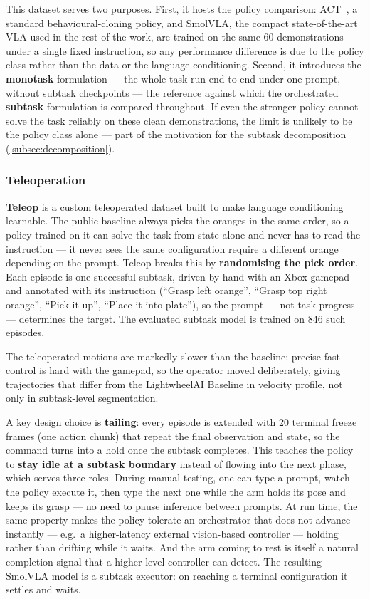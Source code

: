 This dataset serves two purposes. First, it hosts the policy comparison: ACT~\cite{zhao2023act}, a standard behavioural-cloning policy, and SmolVLA, the compact state-of-the-art VLA used in the rest of the work, are trained on the same 60 demonstrations under a single fixed instruction, so any performance difference is due to the policy class rather than the data or the language conditioning. Second, it introduces the \textbf{monotask} formulation --- the whole task run end-to-end under one prompt, without subtask checkpoints --- the reference against which the orchestrated \textbf{subtask} formulation is compared throughout. If even the stronger policy cannot solve the task reliably on these clean demonstrations, the limit is unlikely to be the policy class alone --- part of the motivation for the subtask decomposition (\cref{subsec:decomposition}).

\subsubsection{Teleoperation}
\label{subsec:teleop}

\textbf{Teleop} is a custom teleoperated dataset built to make language conditioning learnable. The public baseline always picks the oranges in the same order, so a policy trained on it can solve the task from state alone and never has to read the instruction --- it never sees the same configuration require a different orange depending on the prompt. Teleop breaks this by \textbf{randomising the pick order}. Each episode is one successful subtask, driven by hand with an Xbox gamepad and annotated with its instruction (``Grasp left orange'', ``Grasp top right orange'', ``Pick it up'', ``Place it into plate''), so the prompt --- not task progress --- determines the target. The evaluated subtask model is trained on 846 such episodes.

The teleoperated motions are markedly slower than the baseline: precise fast control is hard with the gamepad, so the operator moved deliberately, giving trajectories that differ from the LightwheelAI Baseline in velocity profile, not only in subtask-level segmentation.

A key design choice is \textbf{tailing}: every episode is extended with 20 terminal freeze frames (one action chunk) that repeat the final observation and state, so the command turns into a hold once the subtask completes. This teaches the policy to \textbf{stay idle at a subtask boundary} instead of flowing into the next phase, which serves three roles. During manual testing, one can type a prompt, watch the policy execute it, then type the next one while the arm holds its pose and keeps its grasp --- no need to pause inference between prompts. At run time, the same property makes the policy tolerate an orchestrator that does not advance instantly --- e.g.\ a higher-latency external vision-based controller --- holding rather than drifting while it waits. And the arm coming to rest is itself a natural completion signal that a higher-level controller can detect. The resulting SmolVLA model is a subtask executor: on reaching a terminal configuration it settles and waits.

